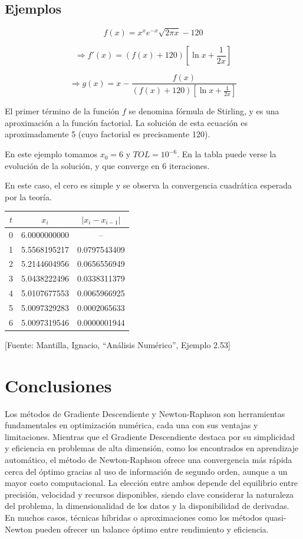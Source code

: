 \documentclass[conference]{IEEEtran}
\begin{document}
\subsection{Ejemplos}
\[f(x) = x^x e^{-x} \sqrt{2\pi x} - 120\]

\[\Rightarrow f'(x) = (f(x) + 120)\left[\ln x + \frac{1}{2x}\right]\]

\[\Rightarrow g(x) = x - \frac{f(x)}{(f(x) + 120)\left[\ln x + \frac{1}{2x}\right]}\]


El primer término de la función $f$ se denomina fórmula de Stirling, y es una aproximación a la función factorial. La solución de esta ecuación es aproximadamente 5 (cuyo factorial es precisamente 120).

En este ejemplo tomamos $x_0 = 6$ y $TOL = 10^{-6}$. En la tabla puede verse la evolución de la solución, y que converge en 6 iteraciones.

En este caso, el cero es simple y se observa la convergencia cuadrática esperada por la teoría.


\begin{center}
\begin{tabular}{c c c}
\toprule
$t$ & $x_i$ & $|x_i - x_{i-1}|$ \\
\midrule
0 & 6.0000000000 & -- \\
1 & 5.5568195217 & 0.0797543409 \\
2 & 5.2144604956 & 0.0656556949 \\
3 & 5.0438222496 & 0.0338311379 \\
4 & 5.0107677553 & 0.0065966925 \\
5 & 5.0097329283 & 0.0002065633 \\
6 & 5.0097319546 & 0.0000001944 \\
\bottomrule
\end{tabular}

[Fuente: Mantilla, Ignacio, ``Análisis Numérico'', Ejemplo 2.53]
\end{center}

\section{Conclusiones}
Los métodos de Gradiente Descendiente y Newton-Raphson son herramientas fundamentales en optimización numérica, cada una con sus ventajas y limitaciones. Mientras que el Gradiente Descendiente destaca por su simplicidad y eficiencia en problemas de alta dimensión, como los encontrados en aprendizaje automático, el método de Newton-Raphson ofrece una convergencia más rápida cerca del óptimo gracias al uso de información de segundo orden, aunque a un mayor costo computacional. La elección entre ambos depende del equilibrio entre precisión, velocidad y recursos disponibles, siendo clave considerar la naturaleza del problema, la dimensionalidad de los datos y la disponibilidad de derivadas. En muchos casos, técnicas híbridas o aproximaciones como los métodos quasi-Newton pueden ofrecer un balance óptimo entre rendimiento y eficiencia.
\end{document}

